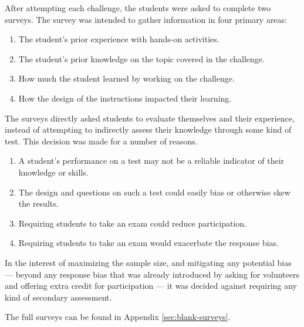     After attempting each challenge, the students were asked to complete two surveys. 
    The survey was intended to gather information in four primary areas:
    \begin{enumerate}
        \item The student's prior experience with hands-on activities.
        \item The student's prior knowledge on the topic covered in the challenge.
        \item How much the student learned by working on the challenge.
        \item How the design of the instructions impacted their learning. 
    \end{enumerate}
    
    The surveys directly asked students to evaluate themselves and their experience, instead of attempting to indirectly assess their knowledge through some kind of test. 
    This decision was made for a number of reasons. 
    \begin{enumerate}
        \item A student's performance on a test may not be a reliable indicator of their knowledge or skills.
        \item The design and questions on such a test could easily bias or otherwise skew the results. 
        \item Requiring students to take an exam could reduce participation. 
        \item Requiring students to take an exam would exacerbate the response bias.
    \end{enumerate}

    In the interest of maximizing the sample size, and mitigating any potential bias --- 
    beyond any response bias that was already introduced by asking for volunteers and offering extra credit for participation --- 
    it was decided against requiring any kind of secondary assessment. 

    The full surveys can be found in Appendix \ref{sec:blank-surveys}.


